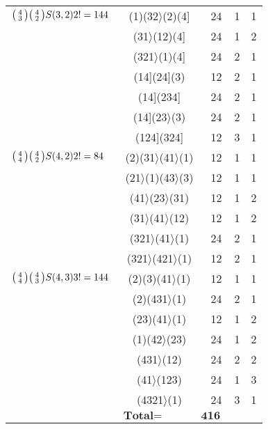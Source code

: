 \documentclass{surv-l}
\numberwithin{equation}{section}
\numberwithin{table}{section}
\numberwithin{figure}{section}
\theoremstyle{plain}
\theoremstyle{definition}
\begin{document}
\begin{table}[!h]
{\begin{tabular}{|l|c|c|c|c|}
\hline
$\big(\kern0.5pt\begin{smallmatrix}4\\ 3 \end{smallmatrix}\kern0.5pt\big)\big(\kern0.5pt\begin{smallmatrix}4\\ 2\end{smallmatrix}\kern0.5pt\big)S(3,2)2!=144$ &(1)(32$\rangle$(2)(4] &24 &1 &1 \\
&(31$\rangle$(12)(4] &24 &1 &2 \\
&(321$\rangle$(1)(4] &24 &2 &1 \\
&(14](24](3) &12 &2 &1 \\
&(14](234] &24 &2 &1 \\
&(14](23$\rangle$(3) &24 &2 &1 \\
&(124](324] &12 &3 &1 \\
\hline
$\big(\kern0.5pt\begin{smallmatrix}4\\ 4\end{smallmatrix}\kern0.5pt\big)\big(\kern0.5pt\begin{smallmatrix}4\\ 2\end{smallmatrix}\kern0.5pt\big)S(4,2)2!=84$ &(2)(31$\rangle$(41$\rangle$(1) &12 &1 &1 \\
&(21$\rangle$(1)(43$\rangle$(3) &12 &1 &1 \\
&(41$\rangle$(23$\rangle$(31) &12 &1 &2 \\
&(31$\rangle$(41$\rangle$(12) &12 &1 &2 \\
&(321$\rangle$(41$\rangle$(1) &24 &2 &1 \\
&(321$\rangle$(421$\rangle$(1) &12 &2 &1 \\
\hline
$\big(\kern0.5pt\begin{smallmatrix}4\\ 4\end{smallmatrix}\kern0.5pt\big)\big(\kern0.5pt\begin{smallmatrix}4\\ 3\end{smallmatrix}\kern0.5pt\big)S(4,3)3!=144$ &(2)(3)(41$\rangle$(1) &12 &1 &1 \\
&(2)(431$\rangle$(1) &24 &2 &1 \\
&(23)(41$\rangle$(1) &12 &1 &2 \\
&(1)(42$\rangle$(23) &24 &1 &2 \\
&(431$\rangle$(12) &24 &2 &2 \\
&(41$\rangle$(123) &24 &1 &3 \\
&(4321$\rangle$(1) &24 &3 &1 \\
\hline
&\multicolumn{2}{c}{$\textbf{Total} =\qquad\quad\enspace \textbf{416}$} & & \\
\hline
\end{tabular}}{}
\end{table}
\end{document}
